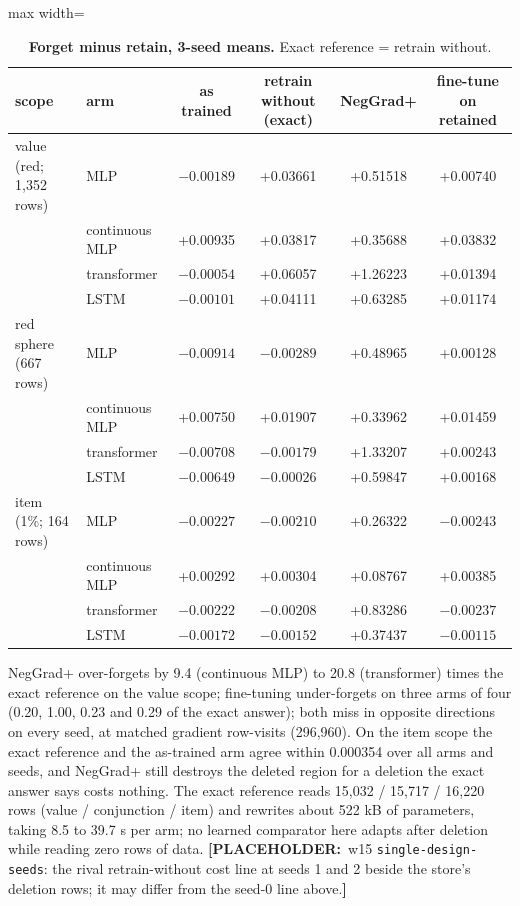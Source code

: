\documentclass{article}
\newcommand{\PLACEHOLDER}[1]{{\color{red}\textbf{[PLACEHOLDER:}~#1\textbf{]}}}
\begin{document}
\begin{table}[h]
\centering\small
\caption{\textbf{Forget minus retain, 3-seed means.} Exact reference = retrain without.}
\label{tab:unlearn}
\setlength{\tabcolsep}{3pt}
\begin{adjustbox}{max width=\linewidth}\begin{tabular}{llcccc}
\toprule
scope & arm & as trained & retrain without (exact) & NegGrad+ & fine-tune on retained \\
\midrule
value (red; 1,352 rows) & MLP & $-0.00189$ & +0.03661 & +0.51518 & +0.00740 \\
 & continuous MLP & +0.00935 & +0.03817 & +0.35688 & +0.03832 \\
 & transformer & $-0.00054$ & +0.06057 & +1.26223 & +0.01394 \\
 & LSTM & $-0.00101$ & +0.04111 & +0.63285 & +0.01174 \\
red sphere (667 rows) & MLP & $-0.00914$ & $-0.00289$ & +0.48965 & +0.00128 \\
 & continuous MLP & +0.00750 & +0.01907 & +0.33962 & +0.01459 \\
 & transformer & $-0.00708$ & $-0.00179$ & +1.33207 & +0.00243 \\
 & LSTM & $-0.00649$ & $-0.00026$ & +0.59847 & +0.00168 \\
item (1\%; 164 rows) & MLP & $-0.00227$ & $-0.00210$ & +0.26322 & $-0.00243$ \\
 & continuous MLP & +0.00292 & +0.00304 & +0.08767 & +0.00385 \\
 & transformer & $-0.00222$ & $-0.00208$ & +0.83286 & $-0.00237$ \\
 & LSTM & $-0.00172$ & $-0.00152$ & +0.37437 & $-0.00115$ \\
\bottomrule
\end{tabular}\end{adjustbox}
\end{table}

\noindent NegGrad+ over-forgets by 9.4 (continuous MLP) to 20.8 (transformer) times the exact
reference on the value scope; fine-tuning under-forgets on three arms of four (0.20, 1.00, 0.23 and
0.29 of the exact answer); both miss in opposite directions on every seed, at matched gradient
row-visits (296,960). On the item scope the exact reference and the as-trained arm agree within
0.000354 over all arms and seeds, and NegGrad+ still destroys the deleted region for a deletion the
exact answer says costs nothing. The exact reference reads 15,032 / 15,717 / 16,220 rows (value /
conjunction / item) and rewrites about 522 kB of parameters, taking 8.5 to 39.7 s per arm; no learned
comparator here adapts after deletion while reading zero rows of data.
\PLACEHOLDER{w15 \texttt{single-design-seeds}: the rival retrain-without cost line at seeds 1 and 2
beside the store's deletion rows; it may differ from the seed-0 line above.}
\end{document}
